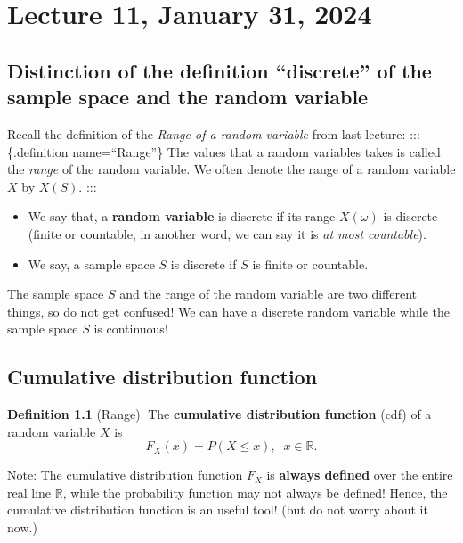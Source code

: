 \documentclass[
]{book}
\theoremstyle{definition}
\newtheorem{definition}{Definition}[chapter]
\theoremstyle{definition}
\theoremstyle{definition}
\theoremstyle{definition}
\theoremstyle{remark}
\begin{document}
\hypertarget{lecture-11-january-31-2024}{%
\chapter{Lecture 11, January 31, 2024}\label{lecture-11-january-31-2024}}

\hypertarget{distinction-of-the-definition-discrete-of-the-sample-space-and-the-random-variable}{%
\section{Distinction of the definition ``discrete'' of the sample space and the random variable}\label{distinction-of-the-definition-discrete-of-the-sample-space-and-the-random-variable}}

Recall the definition of the \emph{Range of a random variable} from last lecture:
::: \{.definition name=``Range''\}
The values that a random variables takes is called the \emph{range} of the random variable. We often denote the range of a random variable \(X\) by \(X(S)\).
:::

\begin{itemize}
\item
  We say that, a \textbf{random variable} is discrete if its range \(X(\omega)\) is discrete (finite or countable, in another word, we can say it is \emph{at most countable}).
\item
  We say, a sample space \(S\) is discrete if \(S\) is finite or countable.
\end{itemize}

The sample space \(S\) and the range of the random variable are two different things, so do not get confused! We can have a discrete random variable while the sample space \(S\) is continuous!

\hypertarget{cumulative-distribution-function}{%
\section{Cumulative distribution function}\label{cumulative-distribution-function}}

\begin{definition}[Range]
The \textbf{cumulative distribution function} (cdf) of a random variable \(X\) is
\[
F_X(x) = P(X \le x),\;\; x \in {\mathbb{R}}.
\]
\end{definition}

Note: The cumulative distribution function \(F_X\) is \textbf{always defined} over the entire real line \(\mathbb{R}\), while the probability function may not always be defined! Hence, the cumulative distribution function is an useful tool! (but do not worry about it now.)
\end{document}
